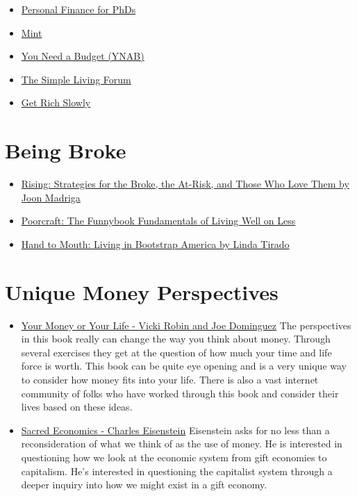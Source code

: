 \documentclass[]{book}
\providecommand{\tightlist}{%
  \setlength{\itemsep}{0pt}\setlength{\parskip}{0pt}}
\theoremstyle{definition}
\theoremstyle{definition}
\theoremstyle{definition}
\theoremstyle{remark}
\begin{document}
\begin{itemize}
\tightlist
\item
  \href{http://pfforphds.com/}{Personal Finance for PhDs}
\item
  \href{https://www.mint.com/}{Mint}
\item
  \href{https://www.youneedabudget.com/}{You Need a Budget (YNAB)}
\item
  \href{http://www.simplelivingforum.net/}{The Simple Living Forum}
\item
  \href{https://www.getrichslowly.org/}{Get Rich Slowly}
\end{itemize}

\section{Being Broke}\label{being-broke}

\begin{itemize}
\tightlist
\item
  \href{https://www.amazon.com/Rising-Strategies-Broke-At-Risk-Those/dp/151874043X/}{Rising:
  Strategies for the Broke, the At-Risk, and Those Who Love Them by Joon
  Madriga}
\item
  \href{https://www.amazon.com/dp/B00I9DOSDU/ref=dp-kindle-redirect?_encoding=UTF8\&btkr=1}{Poorcraft:
  The Funnybook Fundamentals of Living Well on Less}
\item
  \href{https://www.amazon.com/dp/B00JPR5JA0/ref=dp-kindle-redirect?_encoding=UTF8\&btkr=1}{Hand
  to Mouth: Living in Bootstrap America by Linda Tirado}
\end{itemize}

\section{Unique Money Perspectives}\label{unique-money-perspectives}

\begin{itemize}
\tightlist
\item
  \href{https://yourmoneyoryourlife.com/}{Your Money or Your Life -
  Vicki Robin and Joe Dominguez} The perspectives in this book really
  can change the way you think about money. Through several exercises
  they get at the question of how much your time and life force is
  worth. This book can be quite eye opening and is a very unique way to
  consider how money fits into your life. There is also a vast internet
  community of folks who have worked through this book and consider
  their lives based on these ideas.\\
\item
  \href{http://sacred-economics.com/}{Sacred Economics - Charles
  Eisenstein} Eisenstein asks for no less than a reconsideration of what
  we think of as the use of money. He is interested in questioning how
  we look at the economic system from gift economies to capitalism. He's
  interested in questioning the capitalist system through a deeper
  inquiry into how we might exist in a gift economy.
\end{itemize}
\end{document}
